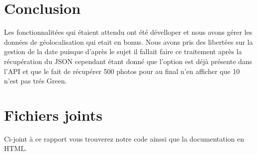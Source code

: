 \documentclass[a4paper, 11pt]{article}
\begin{document}
\section*{Conclusion }
Les fonctionnalitées qui étaient attendu ont été dévelloper et nous avons gérer les données de géolocalisation qui etait en bonus. Nous avons pris des libertées sur la gestion de la date puisque d'après le sujet il fallait faire ce traitement après la récupération du JSON cependant étant donné que l'option est déjà présente dans l'API et que le fait de récupérer 500 photos pour au final n'en afficher que 10 n'est pas trés Green.

\section*{Fichiers joints}
Ci-joint à ce rapport vous trouverez notre code ainssi que la documentation en HTML.
\end{document}

